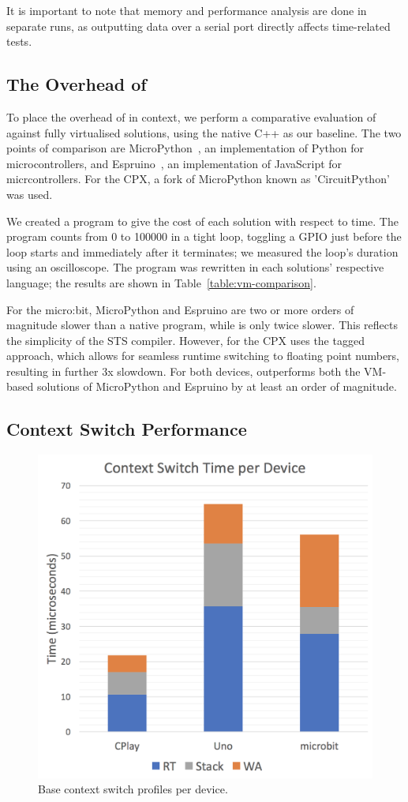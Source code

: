 It is important to note that memory and performance analysis are done in separate runs, as outputting data over a serial port directly affects time-related tests.

\subsection{The Overhead of \MC}

To place the overhead of \MC in context, we perform a comparative evaluation of \MC against fully virtualised solutions, using the native C++ as our baseline. The two points of comparison are MicroPython~\cite{MicroPython}, an implementation of Python for microcontrollers, and Espruino~\cite{espruinoBook}, an implementation of JavaScript for micrcontrollers. For the CPX, a fork of MicroPython  known as 'CircuitPython' was used.

We created a program to give the cost of each solution with respect to time. The program counts from 0 to 100000 in a tight loop, toggling a GPIO just before the loop starts and immediately after it terminates; we measured the loop's duration using an oscilloscope. The program was rewritten in each solutions' respective language; the results are shown in Table~\ref{table:vm-comparison}.

For the micro:bit, MicroPython and Espruino are two or more orders of magnitude slower than a native \CO program, while \MC is only twice slower.
This reflects the simplicity of the STS compiler.
However, \MC for the CPX uses the tagged approach, which allows for seamless runtime switching to floating point numbers,
resulting in further 3x slowdown.
For both devices, \MC outperforms both the VM-based solutions of MicroPython and Espruino by at least an order of magnitude.

\subsection{Context Switch Performance}

\begin{figure}[ht]
    \includegraphics[width=.7\columnwidth]{images/context-switch.png}
\caption{\label{fig:context-switch}Base context switch profiles per device.}
\end{figure}

